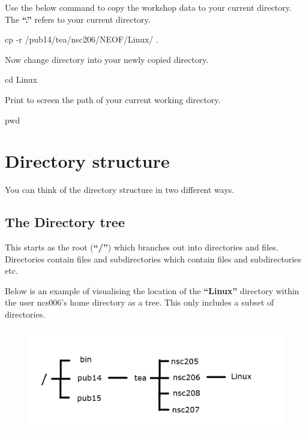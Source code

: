 \documentclass[
  letterpaper,
  DIV=11,
  numbers=noendperiod]{scrreprt}
\newenvironment{Shaded}{\begin{snugshade}}{\end{snugshade}}
\newcommand{\AttributeTok}[1]{\textcolor[rgb]{0.40,0.45,0.13}{#1}}
\newcommand{\BuiltInTok}[1]{\textcolor[rgb]{0.00,0.23,0.31}{#1}}
\newcommand{\FunctionTok}[1]{\textcolor[rgb]{0.28,0.35,0.67}{#1}}
\newcommand{\NormalTok}[1]{\textcolor[rgb]{0.00,0.23,0.31}{#1}}
\begin{document}
Use the below command to copy the workshop data to your current
directory. The \textbf{``.''} refers to your current directory.

\begin{Shaded}
\begin{Highlighting}[]
\FunctionTok{cp} \AttributeTok{{-}r}\NormalTok{ /pub14/tea/nsc206/NEOF/Linux/ .}
\end{Highlighting}
\end{Shaded}

Now change directory into your newly copied directory.

\begin{Shaded}
\begin{Highlighting}[]
\BuiltInTok{cd}\NormalTok{ Linux}
\end{Highlighting}
\end{Shaded}

Print to screen the path of your current working directory.

\begin{Shaded}
\begin{Highlighting}[]
\BuiltInTok{pwd}
\end{Highlighting}
\end{Shaded}

\hypertarget{directory-structure}{%
\section{Directory structure}\label{directory-structure}}

You can think of the directory structure in two different ways.

\hypertarget{the-directory-tree}{%
\subsection{The Directory tree}\label{the-directory-tree}}

This starts as the root (\textbf{``/''}) which branches out into
directories and files. Directories contain files and subdirectories
which contain files and subdirectories etc.

Below is an example of visualising the location of the
\textbf{``Linux''} directory within the user ncs006's home directory as
a tree. This only includes a subset of directories.

\begin{figure}

{\centering \includegraphics[width=1\textwidth,height=\textheight]{figures/linux_tree_structure.png}

}

\end{figure}
\end{document}
